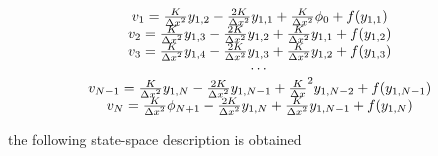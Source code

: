 \documentclass[journal]{IEEEtran}
\begin{document}
\begin{equation} \label{modified_controlled_inputs}
\begin{tabular}{c}
$v_1={K \over {{\Delta}x}^2}y_{1,2}-{{2K} \over {{\Delta}x^2}}y_{1,1}+{K \over {{\Delta}x^2}}\phi_0+f(y_{1,1})$\\
$v_2={K \over {{\Delta}x}^2}y_{1,3}-{{2K} \over {{\Delta}x^2}}y_{1,2}+{K \over {{\Delta}x^2}}y_{1,1}+f(y_{1,2})$\\
$v_3={K \over {{\Delta}x}^2}y_{1,4}-{{2K} \over {{\Delta}x^2}}y_{1,3}+{K \over {{\Delta}x^2}}y_{1,2}+f(y_{1,3})$\\
$\cdots$ \\
$v_{N-1}={K \over {{\Delta}x}^2}y_{1,N}-{{2K} \over {{\Delta}x}^2}y_{1,N-1}+{{K \over {\Delta}x}^2}y_{1,N-2}+f(y_{1,N-1})$\\
$v_N={K \over {{\Delta}x}^2}\phi_{N+1}-{{2K} \over {{\Delta}x}^2}y_{1,N}+{K \over {{\Delta}x}^2}y_{1,N-1}+f(y_{1,N})$
\end{tabular}
\end{equation}

\noindent the following state-space description is obtained
\end{document}
